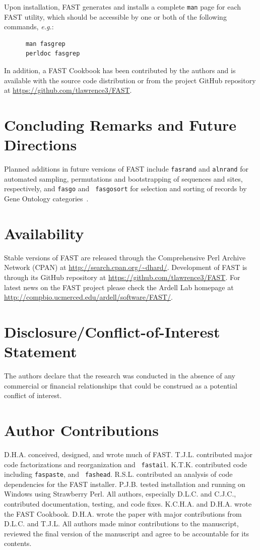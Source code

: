 \documentclass{frontiersSCNS} %
\begin{document}
Upon installation, FAST generates and installs a complete {\tt man}
page for each FAST utility, which should be accessible by one or both
of the following commands, {\it e.g.}:

\begin{verbatim}
      man fasgrep
      perldoc fasgrep
\end{verbatim}

In addition, a FAST Cookbook has been contributed by the authors and is
available with the source code distribution or from the project GitHub
repository at \url{https://github.com/tlawrence3/FAST}.

\section{Concluding Remarks and Future Directions}

Planned additions in future versions of FAST include {\tt fasrand} and
{\tt alnrand} for automated sampling, permutations and bootstrapping
of sequences and sites, respectively, and {\tt fasgo} and {\tt
  fasgosort} for selection and sorting of records by Gene Ontology
categories~\citep{GO_Consortium28012015}. 

\section*{Availability}

Stable versions of FAST are released through the Comprehensive Perl
Archive Network (CPAN) at
\url{http://search.cpan.org/~dhard/}. Development of FAST is through
its GitHub repository at \url{https://github.com/tlawrence3/FAST}. For
latest news on the FAST project please check the Ardell Lab homepage
at \url{http://compbio.ucmerced.edu/ardell/software/FAST/}.

\section*{Disclosure/Conflict-of-Interest Statement}

The authors declare that the research was conducted in the absence of
any commercial or financial relationships that could be construed as a
potential conflict of interest.

\section*{Author Contributions}

D.H.A. conceived, designed, and wrote much of FAST. T.J.L. contributed
major code factorizations and reorganization and {\tt
  fastail}. K.T.K. contributed code including {\tt faspaste}, and {\tt
  fashead}. R.S.L. contributed an analysis of code dependencies for
the FAST installer. P.J.B. tested installation and running on Windows
using Strawberry Perl. All authors, especially D.L.C. and C.J.C.,
contributed documentation, testing, and code fixes. K.C.H.A. and
D.H.A. wrote the FAST Cookbook. D.H.A. wrote the paper with major
contributions from D.L.C. and T.J.L. All authors made minor
contributions to the manuscript, reviewed the final version of the
manuscript and agree to be accountable for its contents.
\end{document}
